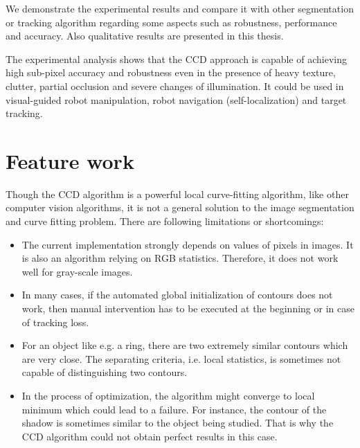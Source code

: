 We demonstrate the experimental results and compare it with other
segmentation or tracking algorithm regarding some aspects such as
robustness, performance and accuracy. Also qualitative
results are presented in this thesis.

The experimental analysis shows that the CCD approach is capable of
achieving high sub-pixel accuracy and robustness even in the presence
of heavy texture, clutter, partial occlusion and severe changes of
illumination. It could be used in  visual-guided robot
manipulation, robot navigation (self-localization) and target
tracking.

\section{Feature work}
\label{sec:feature}

Though the CCD algorithm is a powerful local curve-fitting algorithm,
like other computer vision algorithms, it is not a general solution to
the image segmentation and curve fitting problem. There are following
limitations or shortcomings:
\begin{itemize}
\item The current implementation strongly depends on values of pixels in
  images. It is also an algorithm relying on RGB statistics. Therefore, it
  does not work well for gray-scale images.
\item In many cases, if the automated global initialization of contours does
  not work, then manual intervention has to be executed at the beginning or
  in case of tracking loss.
\item For an object like e.g. a ring, there are two extremely similar
  contours which are very close. The separating criteria, i.e. local
  statistics, is sometimes not capable of distinguishing two contours.
\item In the process of optimization, the algorithm might converge to
  local minimum which could lead to a failure. For instance, the
  contour of the shadow is sometimes similar to the object being
  studied. That is why the CCD algorithm could not obtain perfect results in this case.
\end{itemize}


